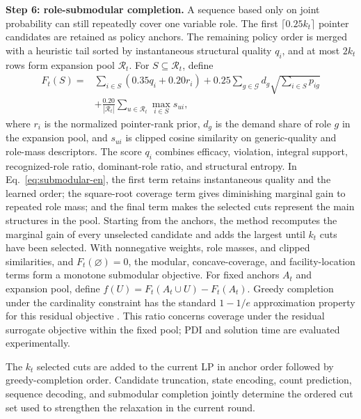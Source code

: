 \documentclass[journal]{IEEEtran}
\begin{document}
\noindent\textbf{Step 6: role-submodular completion.} A sequence based only on joint probability can still repeatedly cover one variable role. The first $\lceil0.25k_t\rceil$ pointer candidates are retained as policy anchors. The remaining policy order is merged with a heuristic tail sorted by instantaneous structural quality $q_i$, and at most $2k_t$ rows form expansion pool $\mathcal R_t$. For $S\subseteq\mathcal R_t$, define
\begin{equation}
\begin{aligned}
F_t(S)={}&\sum_{i\in S}(0.35q_i+0.20r_i)
+0.25\sum_{g\in\mathcal G}d_g\sqrt{\sum_{i\in S}p_{ig}}\\
&+\frac{0.20}{|\mathcal R_t|}\sum_{u\in\mathcal R_t}\max_{i\in S}s_{ui},
\end{aligned}
\label{eq:submodular-en}
\end{equation}
where $r_i$ is the normalized pointer-rank prior, $d_g$ is the demand share of role $g$ in the expansion pool, and $s_{ui}$ is clipped cosine similarity on generic-quality and role-mass descriptors. The score $q_i$ combines efficacy, violation, integral support, recognized-role ratio, dominant-role ratio, and structural entropy. In Eq.~\eqref{eq:submodular-en}, the first term retains instantaneous quality and the learned order; the square-root coverage term gives diminishing marginal gain to repeated role mass; and the final term makes the selected cuts represent the main structures in the pool. Starting from the anchors, the method recomputes the marginal gain of every unselected candidate and adds the largest until $k_t$ cuts have been selected. With nonnegative weights, role masses, and clipped similarities, and $F_t(\varnothing)=0$, the modular, concave-coverage, and facility-location terms form a monotone submodular objective. For fixed anchors $A_t$ and expansion pool, define $f(U)=F_t(A_t\cup U)-F_t(A_t)$. Greedy completion under the cardinality constraint has the standard $1-1/e$ approximation property for this residual objective \cite{nemhauser1978analysis}. This ratio concerns coverage under the residual surrogate objective within the fixed pool; PDI and solution time are evaluated experimentally.

The $k_t$ selected cuts are added to the current LP in anchor order followed by greedy-completion order. Candidate truncation, state encoding, count prediction, sequence decoding, and submodular completion jointly determine the ordered cut set used to strengthen the relaxation in the current round.
\end{document}
